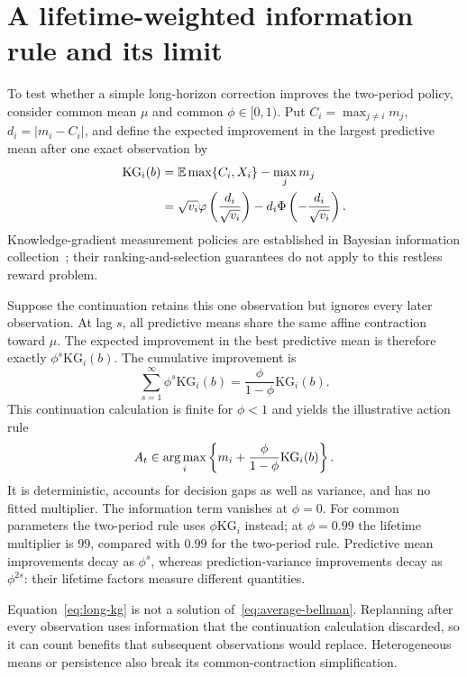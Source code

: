 \section{A lifetime-weighted information rule and its limit}
\label{sec:long-kg}
To test whether a simple long-horizon correction improves the two-period policy, consider common mean $\mu$ and common $\phi\in[0,1)$. Put $C_i=\max_{j\ne i}m_j$, $d_i=|m_i-C_i|$, and define the expected improvement in the largest predictive mean after one exact observation by
\begin{align}
\mathrm{KG}_i(b)
&=\mathbb E\max\{C_i,X_i\}-\max_jm_j\nonumber\\
&=\sqrt{v_i}\varphi\left(\frac{d_i}{\sqrt{v_i}}\right)
-d_i\Phi\left(-\frac{d_i}{\sqrt{v_i}}\right).
\label{eq:kg}
\end{align}
Knowledge-gradient measurement policies are established in Bayesian information collection~\cite{frazier2008}; their ranking-and-selection guarantees do not apply to this restless reward problem.

Suppose the continuation retains this one observation but ignores every later observation. At lag $s$, all predictive means share the same affine contraction toward $\mu$. The expected improvement in the best predictive mean is therefore exactly $\phi^s\mathrm{KG}_i(b)$. The cumulative improvement is
\begin{equation}
\sum_{s=1}^\infty\phi^s\mathrm{KG}_i(b)
=\frac\phi{1-\phi}\mathrm{KG}_i(b).
\end{equation}
This continuation calculation is finite for $\phi<1$ and yields the illustrative action rule
\begin{equation}
A_t\in\operatorname*{arg\,max}_i\left\{m_i+\frac\phi{1-\phi}\mathrm{KG}_i(b)\right\}.
\label{eq:long-kg}
\end{equation}
It is deterministic, accounts for decision gaps as well as variance, and has no fitted multiplier. The information term vanishes at $\phi=0$. For common parameters the two-period rule uses $\phi\mathrm{KG}_i$ instead; at $\phi=0.99$ the lifetime multiplier is $99$, compared with $0.99$ for the two-period rule. Predictive mean improvements decay as $\phi^s$, whereas prediction-variance improvements decay as $\phi^{2s}$: their lifetime factors measure different quantities.

Equation~\eqref{eq:long-kg} is not a solution of~\eqref{eq:average-bellman}. Replanning after every observation uses information that the continuation calculation discarded, so it can count benefits that subsequent observations would replace. Heterogeneous means or persistence also break its common-contraction simplification.

